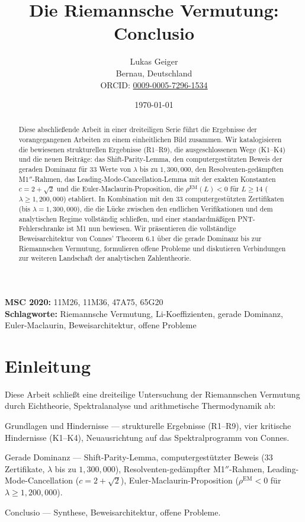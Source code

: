 \documentclass[12pt,a4paper]{article}
\title{Die Riemannsche Vermutung: Conclusio}
\author{Lukas Geiger\\
\small Bernau, Deutschland\\
\small ORCID: \href{https://orcid.org/0009-0005-7296-1534}{0009-0005-7296-1534}}
\date{\today}
\theoremstyle{definition}
\theoremstyle{remark}
\begin{document}
\maketitle

\begin{abstract}
Diese abschließende Arbeit in einer dreiteiligen Serie führt die Ergebnisse der vorangegangenen Arbeiten zu einem einheitlichen Bild zusammen. Wir katalogisieren die bewiesenen strukturellen Ergebnisse (R1--R9), die ausgeschlossenen Wege (K1--K4) und die neuen Beiträge: das Shift-Parity-Lemma, den computergestützten Beweis der geraden Dominanz für 33 Werte von $\lambda$ bis zu $1{,}300{,}000$, den Resolventen-gedämpften M1$''$-Rahmen, das Leading-Mode-Cancellation-Lemma mit der exakten Konstanten $c = 2 + \sqrt{2}$ und die Euler-Maclaurin-Proposition, die $\rho^{\mathrm{EM}}(L) < 0$ für $L \geq 14$ ($\lambda \geq 1{,}200{,}000$) etabliert. In Kombination mit den $33$ computergestützten Zertifikaten (bis $\lambda = 1{,}300{,}000$), die die Lücke zwischen den endlichen Verifikationen und dem analytischen Regime vollständig schließen, und einer standardmäßigen PNT-Fehlerschranke ist M1 nun bewiesen. Wir präsentieren die vollständige Beweisarchitektur von Connes' Theorem 6.1 über die gerade Dominanz bis zur Riemannschen Vermutung, formulieren offene Probleme und diskutieren Verbindungen zur weiteren Landschaft der analytischen Zahlentheorie.
\end{abstract}

\noindent\textbf{MSC 2020:} 11M26, 11M36, 47A75, 65G20\\
\textbf{Schlagworte:} Riemannsche Vermutung, Li-Koeffizienten, gerade Dominanz, Euler-Maclaurin, Beweisarchitektur, offene Probleme

\newpage
\tableofcontents


\section{Einleitung}
\label{sec:intro}

Diese Arbeit schließt eine dreiteilige Untersuchung der Riemannschen Vermutung durch Eichtheorie, Spektralanalyse und arithmetische Thermodynamik ab:
\begin{description}[font=\bfseries,leftmargin=2em]
  \item[Teil~I \cite{Geiger2026partI}:] Grundlagen und Hindernisse --- strukturelle Ergebnisse (R1--R9), vier kritische Hindernisse (K1--K4), Neuausrichtung auf das Spektralprogramm von Connes.
  \item[Teil~II \cite{Geiger2026partII}:] Gerade Dominanz --- Shift-Parity-Lemma, computergestützter Beweis ($33$ Zertifikate, $\lambda$ bis zu $1{,}300{,}000$), Resolventen-gedämpfter M1$''$-Rahmen, Leading-Mode-Cancellation ($c = 2 + \sqrt{2}$), Euler-Maclaurin-Proposition ($\rho^{\mathrm{EM}} < 0$ für $\lambda \geq 1{,}200{,}000$).
  \item[Teil~III (diese Arbeit):] Conclusio --- Synthese, Beweisarchitektur, offene Probleme.
\end{description}
\end{document}
